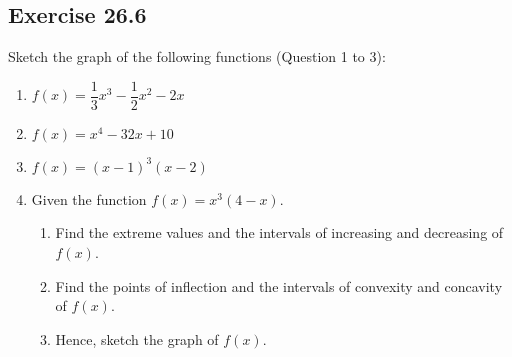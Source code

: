 \subsection{Exercise 26.6}

Sketch the graph of the following functions (Question 1 to 3):

\begin{enumerate}
    \item $f(x)=\dfrac{1}{3} x^3-\dfrac{1}{2} x^2-2 x$
    \item $f(x)=x^4-32 x+10$
    \item $f(x)=(x-1)^3(x-2)$
    \item Given the function $f(x) = x^3(4-x)$.
          \begin{enumerate}
              \item Find the extreme values and the intervals of increasing and decreasing of
                    $f(x)$.
              \item Find the points of inflection and the intervals of convexity and concavity of
                    $f(x)$.
              \item Hence, sketch the graph of $f(x)$.
          \end{enumerate}
\end{enumerate}